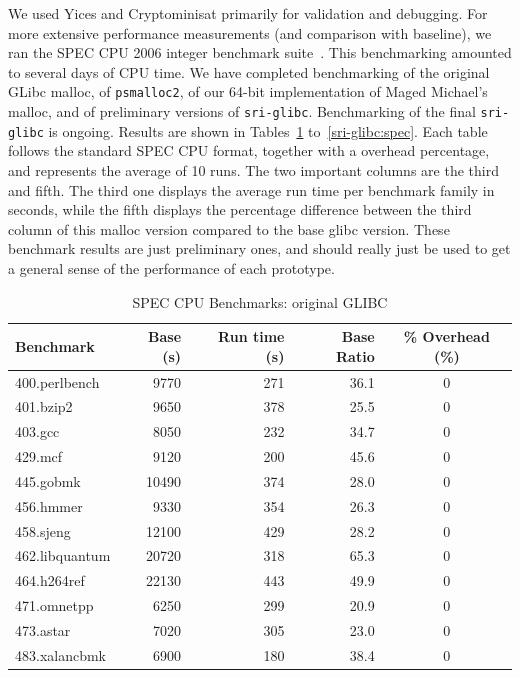 \documentclass[12pt]{cslreport}
\begin{document}
We used Yices and Cryptominisat primarily for validation and
debugging. For more extensive performance measurements (and comparison
with baseline), we ran the SPEC CPU 2006 integer benchmark
suite~\cite{spec2006}. This benchmarking amounted to several days of
CPU time. We have completed benchmarking of the original GLibc malloc,
of \texttt{psmalloc2}, of our 64-bit implementation of Maged Michael's
malloc, and of preliminary versions of
\texttt{sri-glibc}. Benchmarking of the final \texttt{sri-glibc} is
ongoing.  Results are shown in Tables~\ref{glibc:spec}
to~\ref{sri-glibc:spec}.  Each table follows the standard SPEC CPU format,
together with a overhead percentage,
and represents the average of 10 runs. The two important columns are
the third and fifth. The third one displays the average run time per benchmark
family in seconds, while the fifth displays the percentage difference between
the third column of this malloc version compared to the base glibc version.
These benchmark results are just preliminary ones, and should really just be used to get
a general sense of the performance of each prototype.


\begin{table}
\begin{center}
\begin{tabular}{|l|r|r|r|c|}
\hline
Benchmark  & Base  (s)  & Run time (s) &  Base Ratio & \% Overhead (\%)\\
\hline
400.perlbench    & 9770        & 271       & 36.1 & 0 \\
401.bzip2        & 9650        & 378       & 25.5 & 0 \\
403.gcc          & 8050        & 232       & 34.7 & 0 \\
429.mcf          & 9120        & 200       & 45.6 & 0 \\
445.gobmk       & 10490        & 374       & 28.0 & 0 \\
456.hmmer        & 9330        & 354       & 26.3 & 0 \\
458.sjeng       & 12100        & 429       & 28.2 & 0 \\
462.libquantum  & 20720        & 318       & 65.3 & 0 \\
464.h264ref     & 22130        & 443       & 49.9 & 0 \\
471.omnetpp      & 6250        & 299       & 20.9 & 0 \\
473.astar        & 7020        & 305       & 23.0 & 0 \\
483.xalancbmk    & 6900        & 180       & 38.4 & 0 \\
\hline
\end{tabular}
\end{center}
\caption{SPEC CPU Benchmarks: original GLIBC}
\label{glibc:spec}
\end{table}
\end{document}
